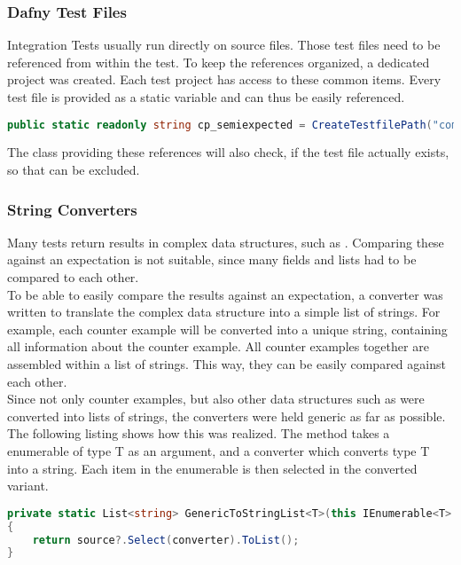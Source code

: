 \subsubsection{Dafny Test Files}
Integration Tests usually run directly on  source files.
Those test files need to be referenced from within the test.
To keep the references organized, a dedicated project  was created.
Each test project has access to these common items.
Every test file is provided as a static variable and can thus be easily referenced.

\begin{lstlisting}[language=csharp, caption={Test File Reference}, captionpos=b, label={lst:semiExpectedCodeThing}]
public static readonly string cp_semiexpected = CreateTestfilePath("compile/semi_expected_error.dfy");
\end{lstlisting}
The class providing these references will also check, if the test file actually exists, so that  can be excluded.

\subsubsection{String Converters}
Many tests return results in complex data structures, such as .
Comparing these against an expectation is not suitable, since many fields and lists had to be compared to each other.\\
To be able to easily compare the results against an expectation, a converter was written to translate the complex data structure into a simple list of strings.
For example, each counter example will be converted into a unique string, containing all information about the counter example.
All counter examples together are assembled within a list of strings.
This way, they can be easily compared against each other.\\
Since not only counter examples, but also other data structures such as  were converted into lists of strings, the converters were held generic as far as possible.
The following listing shows how this was realized.
The method takes a enumerable of type T as an argument, and a converter which converts type T into a string.
Each item in the enumerable is then selected in the converted variant.

\begin{lstlisting}[language=csharp, caption={Generic Method to Convert an IEnumerable}, captionpos=b, label={lst:genericconverter}]
private static List<string> GenericToStringList<T>(this IEnumerable<T> source, Func<T, string> converter)
{
    return source?.Select(converter).ToList();
}
\end{lstlisting}

